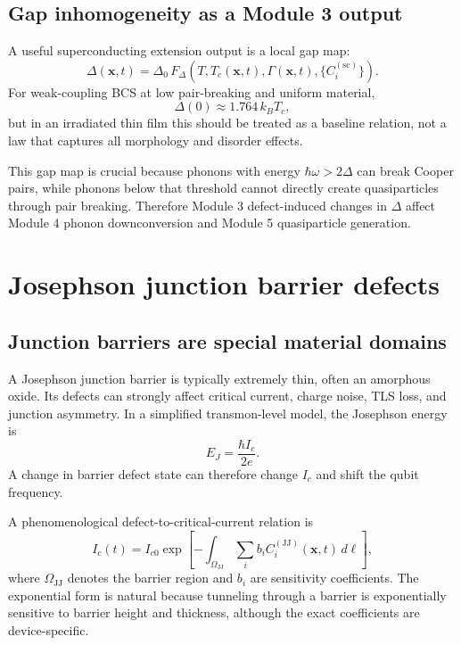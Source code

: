 \documentclass[11pt]{article}
\newcommand{\x}{\mathbf{x}}
\begin{document}
\subsection{Gap inhomogeneity as a Module 3 output}

A useful superconducting extension output is a local gap map:
\begin{equation}
\Delta(\x,t)=\Delta_0\,F_{\Delta}(T,T_c(\x,t),\Gamma(\x,t),\{C_i^{(\mathrm{sc})}\}).
\label{eq:gap_map_general}
\end{equation}
For weak-coupling BCS at low pair-breaking and uniform material,
\begin{equation}
\Delta(0)\approx 1.764\,k_BT_c,
\label{eq:bcs_gap}
\end{equation}
but in an irradiated thin film this should be treated as a baseline relation, not a law that captures all morphology and disorder effects.

This gap map is crucial because phonons with energy $\hbar\omega>2\Delta$ can break Cooper pairs, while phonons below that threshold cannot directly create quasiparticles through pair breaking. Therefore Module 3 defect-induced changes in $\Delta$ affect Module 4 phonon downconversion and Module 5 quasiparticle generation.

\section{Josephson junction barrier defects}

\subsection{Junction barriers are special material domains}

A Josephson junction barrier is typically extremely thin, often an amorphous oxide. Its defects can strongly affect critical current, charge noise, TLS loss, and junction asymmetry. In a simplified transmon-level model, the Josephson energy is
\begin{equation}
E_J=\frac{\hbar I_c}{2e}.
\label{eq:EJ_Ic}
\end{equation}
A change in barrier defect state can therefore change $I_c$ and shift the qubit frequency.

A phenomenological defect-to-critical-current relation is
\begin{equation}
I_c(t)=I_{c0}\exp\left[-\int_{\Omega_{\mathrm{JJ}}}\sum_i b_i C_i^{(\mathrm{JJ})}(\x,t)\,d\ell\right],
\label{eq:Ic_barrier_defects}
\end{equation}
where $\Omega_{\mathrm{JJ}}$ denotes the barrier region and $b_i$ are sensitivity coefficients. The exponential form is natural because tunneling through a barrier is exponentially sensitive to barrier height and thickness, although the exact coefficients are device-specific.
\end{document}
